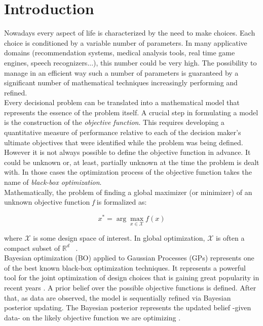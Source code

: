 \chapter{Introduction}

Nowadays every aspect of life is characterized by the need to make choices. Each choice is conditioned by a variable number of parameters. In many applicative domains (recommendation systems, medical analysis tools, real time game engines, speech recognizers...), this number could be very high.  The possibility to manage in an efficient way such a number of parameters is guaranteed by a significant number of mathematical techniques increasingly performing and refined.  \\

Every decisional problem can be translated into a mathematical model that represents the essence of the problem itself. A crucial step in formulating a model is the construction of the \textit{objective function}. This requires developing a quantitative measure of performance relative to each of the decision maker’s ultimate objectives that were identified while the problem was being defined.~\cite{HillLieb01} \\

However it is not always possible to define the objective function in advance. It could be unknown or, at least, partially unknown at the time the problem is dealt with. In those cases the optimization process of the objective function takes the name of \textit{black-box optimization}. \\

Mathematically, the problem of finding a global maximizer (or minimizer) of an unknown objective function \textit{f} is formalized as:

\begin{equation}
x^* = \arg \max_{x \in \mathcal{X}} f(x)
\end{equation}

where $\mathcal{X}$ is some design space of interest. In global optimization, $\mathcal{X}$ is often a compact subset of $\mathbb{R}^d$ ~\cite{DBLP:journals/pieee/ShahriariSWAF16}. \\

Bayesian optimization (BO) applied to Gaussian Processes (GPs) represents one of the best known black-box optimization techniques. It represents a powerful tool for the joint optimization of design choices that is gaining great popularity in recent years \cite{Adams2008GaussianPP}. A prior belief over the possible objective functions is defined. After that, as data are observed, the model is sequentially refined via Bayesian posterior updating. The Bayesian posterior represents the updated belief -given data- on the likely objective function we are optimizing \cite{DBLP:journals/pieee/ShahriariSWAF16}. \\

